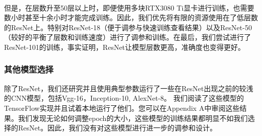 \documentclass[hyperref, UTF8, 12pt]{article}
\theoremstyle{definition}
\begin{document}
\\
\indent
但是，在层数升至50层以上时，即便使用多块RTX3080 Ti显卡进行训练，也需要数小时甚至十余小时才能完成训练。因此，我们优先将有限的资源使用在了低层数的ResNet上。特别对ResNet-18（便于调参与快速训练查看结果）以及ResNet-50（较好的平衡了层数和训练速度）进行了调参和训练。在最后，我们尝试进行了ResNet-101的训练，事实证明，ResNet让模型层数更高，准确度也变得更好。
\\
\indent

\subsubsection{其他模型选择}
除了ResNet，我们还研究并且使用典型参数运行了一些在ResNet出现之前的较浅的CNN模型，包括Vgg-16，Inception-10, AlexNet-8。 我们阅读了这些模型的TensorFlow实现并且试着本地运行了他们。您可以在Appendix A中审阅这些结果。我们发现无论如何调整epoch的大小，这些模型的训练结果都明显不如我们选择的ResNet。因此，我们没有对这些模型进行进一步的调参和设计。
\end{document}

